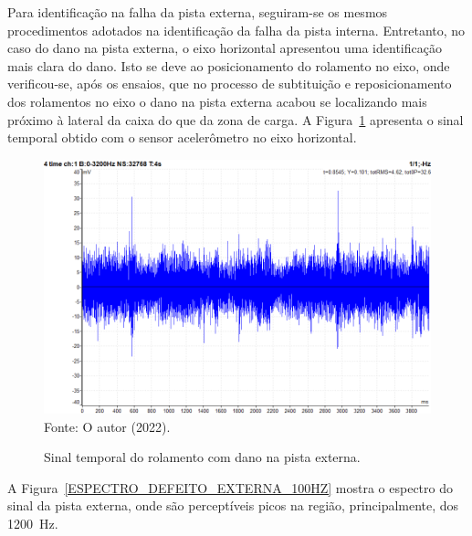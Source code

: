 \documentclass[
	12pt,				
	oneside,			
	a4paper,			
	english,			
	brazil,			
	]{abntex2ppgsi}
\begin{document}
Para identificação na falha da pista externa, seguiram-se os mesmos procedimentos adotados na identificação da falha da pista interna. Entretanto, no caso do dano na pista externa, o eixo horizontal apresentou uma identificação mais clara do dano. Isto se deve ao posicionamento do rolamento no eixo, onde verificou-se, após os ensaios, que no processo de subtituição e reposicionamento dos rolamentos no eixo o dano na pista externa acabou se localizando mais próximo à lateral da caixa do que da zona de carga. A Figura~\ref{TEMPO_DEFEITO_EXTERNA_100HZ_COM_CARGA} apresenta o sinal temporal obtido com o sensor acelerômetro no eixo horizontal.

\begin{figure}[H]
\centering
\caption {Sinal temporal do rolamento com dano na pista externa.}
\includegraphics[width=\textwidth,keepaspectratio]{TEMPO_DEFEITO_EXTERNA_100HZ_COM_CARGA} \\
Fonte: O autor (2022).
\label{TEMPO_DEFEITO_EXTERNA_100HZ_COM_CARGA}
\end{figure}

A Figura~\ref{ESPECTRO_DEFEITO_EXTERNA_100HZ} mostra o espectro do sinal da pista externa, onde são perceptíveis picos na região, principalmente, dos \SI{1200}{\hertz}.  
\end{document}
